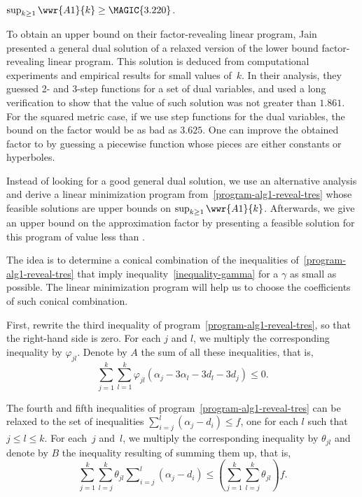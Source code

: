 \begin{lemma}\label{lemma-alg1-lower-tres}
$\sup_{k \ge 1} \wwr{A1}{k} \ge \MAGIC{3.220}$.
\end{lemma}

To obtain an upper bound on their factor-revealing linear program,
Jain~\etal~\cite{JainMMSV03} presented a general dual solution of a
relaxed version of the lower bound factor-revealing linear
program. This solution is deduced from computational experiments and
empirical results for small values of~$k$. In their analysis, they
guessed 2- and 3-step functions for a set of dual variables, and used
a long verification to show that the value of such solution was not
greater than $1.861$. For the squared metric case, if we use step
functions for the dual variables, the bound on the factor would be as
bad as $3.625$. One can improve the obtained factor to 
by guessing a piecewise function whose pieces are either constants or
hyperboles.

Instead of looking for a good general dual solution, we use an alternative 
analysis and derive a linear minimization program from~\eqref{program-alg1-reveal-tres}
whose feasible solutions are upper bounds on $\sup_{k \ge 1} \wwr{A1}{k}$. 
Afterwards, we give an upper bound on the approximation factor by 
presenting a feasible solution for this program of value less than 
.

The idea is to determine a conical combination of the inequalities
of~\eqref{program-alg1-reveal-tres} that imply
inequality~\eqref{inequality-gamma} for a $\gamma$ as small as possible.  The
linear minimization program will help us to choose the coefficients of such
conical combination.

First, rewrite the third inequality of program~\eqref{program-alg1-reveal-tres},
so that the right-hand side is zero. For each $j$ and $l$, we multiply
the corresponding inequality by $\varphi_{jl}$. Denote by $A$ the sum of all
these inequalities, that is,
\begin{equation*}\label{eq-alg1-323-a}
 \sum_{j=1}^{k} \sum_{l = 1}^{k} \varphi_{jl} (\alpha_j - 3 \alpha_l - 3 d_l - 3 d_j) \le 0.
\end{equation*}




The fourth and fifth inequalities of program~\eqref{program-alg1-reveal-tres}
can be relaxed to the set of inequalities $\sum_{i = j}^{l} (\alpha_j - d_i)
\le f$, one for each $l$ such that $j \le l \le k$. For each~$j$ and~$l$,
we multiply the corresponding inequality by $\theta_{jl}$ and denote by $B$
the inequality resulting of summing them up, that is,
\begin{equation*}\label{eq-alg1-323-b}
 \sum_{j=1}^{k} \sum_{l = j}^{k} \theta_{jl} \sum\nolimits_{i = j}^{l} (\alpha_j - d_i)
 \le \left(  \sum_{j=1}^{k} \sum_{l = j}^{k} \theta_{jl} \right) f.
\end{equation*}

